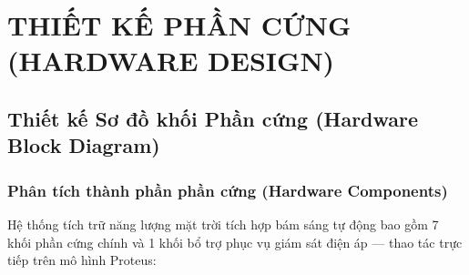 \documentclass[12pt,a4paper]{report}
\begin{document}
\chapter{THIẾT KẾ PHẦN CỨNG (HARDWARE DESIGN)}

\section{Thiết kế Sơ đồ khối Phần cứng (Hardware Block Diagram)}

\subsection{Phân tích thành phần phần cứng (Hardware Components)}

Hệ thống tích trữ năng lượng mặt trời tích hợp bám sáng tự động bao gồm 7 khối phần cứng chính và 1 khối bổ trợ phục vụ giám sát điện áp --- thao tác trực tiếp trên mô hình Proteus:
\end{document}
